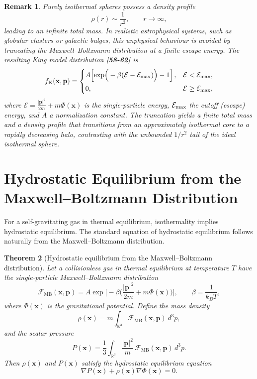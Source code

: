 \documentclass[12pt,a4paper]{article}
\newtheorem{thm}{Theorem}[section]
\newtheorem{rem}[thm]{Remark}
\numberwithin{equation}{section}
\begin{document}
\begin{rem}
Purely isothermal spheres possess a density profile
\[
\rho(r) \sim \frac{1}{r^2}, \qquad r \to \infty,
\]
leading to an \emph{infinite total mass}. In realistic astrophysical systems, such as globular clusters or galactic bulges, this unphysical behaviour is avoided by truncating the Maxwell--Boltzmann distribution at a finite escape energy. The resulting \emph{King model} distribution \textbf{[58-62]} is
\[
f_{\rm K}(\mathbf{x},\mathbf{p}) =
\begin{cases}
A\!\left[\exp\!\Big(-\beta(\mathcal{E}-\mathcal{E}_{\rm max})\Big) - 1\right], & \mathcal{E} < \mathcal{E}_{\rm max}, \\[0.5em]
0, & \mathcal{E} \ge \mathcal{E}_{\rm max},
\end{cases}
\]
where $\mathcal{E} = \frac{|\mathbf{p}|^2}{2m} + m\Phi(\mathbf{x})$ is the single-particle energy, $\mathcal{E}_{\rm max}$ the cutoff (escape) energy, and $A$ a normalization constant. The truncation yields a finite total mass and a density profile that transitions from an approximately isothermal core to a rapidly decreasing halo, contrasting with the unbounded $1/r^2$ tail of the ideal isothermal sphere.
\end{rem}
\section{Hydrostatic Equilibrium from the Maxwell--Boltzmann Distribution}

For a self-gravitating gas in thermal equilibrium, isothermality implies hydrostatic equilibrium. The standard equation of hydrostatic equilibrium follows naturally from the Maxwell--Boltzmann distribution.

\begin{thm}[Hydrostatic equilibrium from the Maxwell--Boltzmann distribution]
Let a collisionless gas in thermal equilibrium at temperature $T$ have the single-particle Maxwell--Boltzmann distribution
\begin{equation}
\mathcal{F}_{\mathrm{MB}}(\mathbf{x},\mathbf{p}) = A \exp\Big[-\beta \Big(\frac{|\mathbf{p}|^2}{2m} + m \Phi(\mathbf{x})\Big)\Big], \qquad \beta = \frac{1}{k_B T},
\end{equation}
where $\Phi(\mathbf{x})$ is the gravitational potential. Define the mass density
\begin{equation}
\rho(\mathbf{x}) = m \int_{\mathbb{R}^3} \mathcal{F}_{\mathrm{MB}}(\mathbf{x},\mathbf{p}) \, d^3 p,
\end{equation}
and the scalar pressure
\begin{equation}
P(\mathbf{x}) = \frac{1}{3} \int_{\mathbb{R}^3} \frac{|\mathbf{p}|^2}{m} \, \mathcal{F}_{\mathrm{MB}}(\mathbf{x},\mathbf{p}) \, d^3 p.
\end{equation}
Then $\rho(\mathbf{x})$ and $P(\mathbf{x})$ satisfy the hydrostatic equilibrium equation
\begin{equation}
\nabla P(\mathbf{x}) + \rho(\mathbf{x}) \nabla \Phi(\mathbf{x}) = 0.
\end{equation}
\end{thm}
\end{document}
